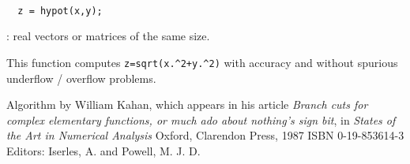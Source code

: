 \begin{mandesc}
  \\
\end{mandesc}
\begin{calling_sequence}
\begin{verbatim}
  z = hypot(x,y);
\end{verbatim}
\end{calling_sequence}
\begin{parameters}
  \begin{varlist}
    : real vectors or matrices of the same size.
  \end{varlist}
\end{parameters}

\begin{mandescription}
  This function computes \verb!z=sqrt(x.^2+y.^2)! with accuracy and without
  spurious underflow / overflow problems.
\end{mandescription}
\begin{authors}
  Algorithm by William Kahan, which
  appears in his article \emph{Branch cuts for complex elementary functions, or
  much ado about nothing's sign bit},
  in \emph{States of the Art in Numerical Analysis} Oxford, Clarendon Press, 1987 ISBN 0-19-853614-3 
  Editors: Iserles, A. and Powell, M. J. D. 
\end{authors}

